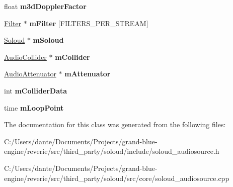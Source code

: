 \begin{DoxyCompactItemize}
float {\bfseries m3d\+Doppler\+Factor}
\item 
\mbox{\label{class_so_loud_1_1_audio_source_a294bed8e6837a86dad209b8afdaa79c7}} 
\mbox{\hyperlink{class_so_loud_1_1_filter}{Filter}} $\ast$ {\bfseries m\+Filter} \mbox{[}F\+I\+L\+T\+E\+R\+S\+\_\+\+P\+E\+R\+\_\+\+S\+T\+R\+E\+AM\mbox{]}
\item 
\mbox{\label{class_so_loud_1_1_audio_source_afc2e18fdd3f712a2e0a140d0332a89e7}} 
\mbox{\hyperlink{class_so_loud_1_1_soloud}{Soloud}} $\ast$ {\bfseries m\+Soloud}
\item 
\mbox{\label{class_so_loud_1_1_audio_source_aed2fd77e57a47ed3b32ea94dad48f3ba}} 
\mbox{\hyperlink{class_so_loud_1_1_audio_collider}{Audio\+Collider}} $\ast$ {\bfseries m\+Collider}
\item 
\mbox{\label{class_so_loud_1_1_audio_source_a557a1ec3830072cad40be75b4b854861}} 
\mbox{\hyperlink{class_so_loud_1_1_audio_attenuator}{Audio\+Attenuator}} $\ast$ {\bfseries m\+Attenuator}
\item 
\mbox{\label{class_so_loud_1_1_audio_source_a4a5224f8ea84fdbbebaebd0064e3911f}} 
int {\bfseries m\+Collider\+Data}
\item 
\mbox{\label{class_so_loud_1_1_audio_source_ac6ed2425f42398344482ea9ebd40a9f7}} 
time {\bfseries m\+Loop\+Point}
\end{DoxyCompactItemize}


The documentation for this class was generated from the following files\+:\begin{DoxyCompactItemize}
\item 
C\+:/\+Users/dante/\+Documents/\+Projects/grand-\/blue-\/engine/reverie/src/third\+\_\+party/soloud/include/soloud\+\_\+audiosource.\+h\item 
C\+:/\+Users/dante/\+Documents/\+Projects/grand-\/blue-\/engine/reverie/src/third\+\_\+party/soloud/src/core/soloud\+\_\+audiosource.\+cpp\end{DoxyCompactItemize}
